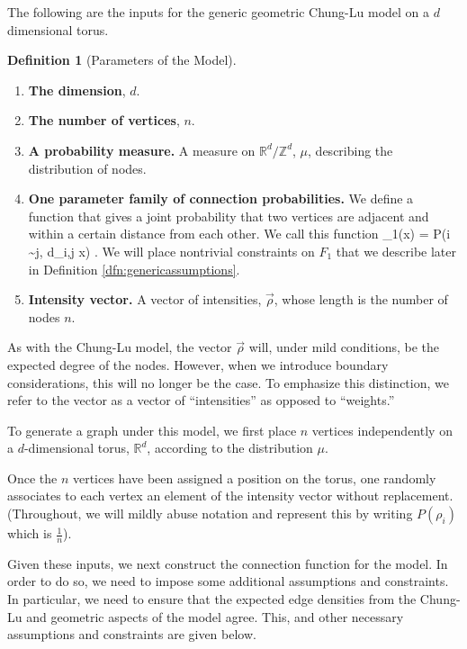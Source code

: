 \documentclass[11]{article}
\newcommand{\R}{\mathbb{R}}
\def\ba #1\ea{\begin{align} #1 \end{align}}
\def\bas #1\eas{\begin{align*} #1 \end{align*}}
\newcommand{\varep}{\varepsilon}
\theoremstyle{remark}
\theoremstyle{definition}
\newtheorem{dfn}[thm]{Definition}
\begin{document}
The following are the inputs for the generic geometric Chung-Lu model on a $d$ dimensional torus. 
\begin{dfn}[Parameters of the Model] \label{dfn:genericinputs} ~\\

\begin{enumerate}
    \item \textbf{The dimension}, $d$.
    \item \textbf{The number of vertices}, $n$.
    \item \textbf{A probability measure.} A measure on $\mathbb{R}^d / \mathbb{Z}^d$, $\mu$, describing the distribution of nodes.
    \item \textbf{One parameter family of connection probabilities.} We define a function that gives a joint probability that two vertices are adjacent and within a certain distance from each other. We call this function \ba F_1(x) = P(i \sim j, d_{i,j} \le x)\label{eq:distandconnect} \ea.  We will place nontrivial constraints on $F_1$ that we describe later in Definition {\ref{dfn:genericassumptions}}.
    \item \textbf{Intensity vector.} A vector of intensities, $\vec{\rho}$, whose length is the number of nodes $n$.
\end{enumerate}
\end{dfn}

As with the Chung-Lu model, the vector $\vec{\rho}$ will, under mild conditions, be the expected degree of the nodes. However, when we introduce boundary considerations, this will no longer be the case. To emphasize this distinction, we refer to the vector as a vector of ``intensities'' as opposed to ``weights.''

To generate a graph under this model, we first place $n$ vertices independently on a $d$-dimensional torus, $\R^d$, according to the distribution $\mu$.

Once the $n$ vertices have been assigned a position on the torus, one randomly associates to each vertex an element of the intensity vector without replacement. (Throughout, we will mildly abuse notation and represent this by writing $P(\rho_i)$ which is $\frac{1}{n}$).

Given these inputs, we next construct the connection function for the model. In order to do so, we need to impose some additional assumptions and constraints. In particular, we need to ensure that the expected edge densities from the Chung-Lu and geometric aspects of the model agree. This, and other necessary assumptions and constraints are given below.
\end{document}
